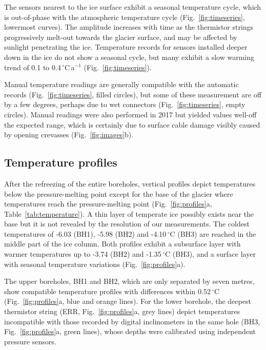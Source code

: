 \documentclass[utf8]{article}
\begin{document}
    The sensors nearest to the ice surface exhibit a seasonal temperature
    cycle, which is out-of-phase with the atmospheric temperature cycle
    (Fig.~\ref{fig:timeseries}, lowermost curves). The
    amplitude increases with time as the thermistor strings progressively
    melt-out towards the glacier surface, and may be affected by sunlight
    penetrating the ice. Temperature records for sensors installed deeper
    down in the ice do not show a seasonal cycle, but many exhibit a slow
    warming trend of 0.1 to 0.4\,$^\circ$C\,a$^{-1}$
    (Fig.~\ref{fig:timeseries}).

    Manual temperature readings are generally compatible with the automatic
    records (Fig.~\ref{fig:timeseries}, filled circles), but some of these
    measurement are off by a few degrees, perhaps due to wet connectors
    (Fig.~\ref{fig:timeseries}, empty circles). Manual readings were also
    performed in 2017 but yielded values well-off the expected range, which
    is certainly due to surface cable damage visibly caused by opening crevasses
    (Fig.~\ref{fig:images}b).


\subsection{Temperature profiles}

    After the refreezing of the entire boreholes, vertical profiles depict
    temperatures below the pressure-melting point except for the base of the
    glacier where temperatures reach the pressure-melting point
    (Fig.~\ref{fig:profiles}a, Table~\ref{tab:temperature}). A thin layer of
    temperate ice possibly exists near the base
    but it is not revealed by the resolution of our measurements. The coldest
    temperatures of -6.03 (BH1), -5.98 (BH2) and -4.10\,$^\circ$C (BH3)
    are reached in the middle part of the ice column. Both profiles exhibit a
    subsurface layer with warmer temperatures up to -3.74 (BH2) and -1.35\,$^\circ$C
    (BH3), and a surface layer with
    seasonal temperature variations (Fig.~\ref{fig:profiles}a).

    The upper boreholes, BH1 and BH2, which are only separated by seven metres,
    show compatible temperature profiles with differences within 0.52\,$^\circ$C
    (Fig.~\ref{fig:profiles}a, blue and
    orange lines). For the lower borehole, the deepest thermistor string (ERR,
    Fig.~\ref{fig:profiles}a, grey lines) depict temperatures incompatible
    with those recorded by digital inclinometers in the same hole
    (BH3, Fig.~\ref{fig:profiles}a, green lines), whose depths were calibrated
    using independent pressure sensors.
\end{document}
